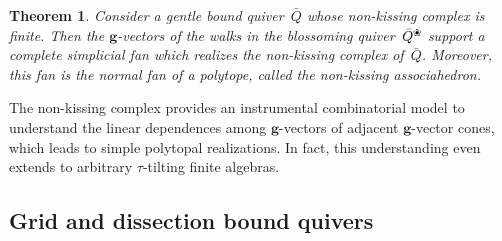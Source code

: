 \documentclass{amsart}
\newtheorem*{theorem*}{Theorem}%
\theoremstyle{definition}
\renewcommand{\b}[1]{\mathbf{#1}} %
\newcommand{\blossom}{^\text{\ding{96}}} %
\begin{document}
\begin{theorem*}
Consider a gentle bound quiver~$\bar Q$ whose non-kissing complex is finite.
Then the \mbox{$\b{g}$-vectors} of the walks in the blossoming quiver~$\bar Q\blossom$ support a complete simplicial fan which realizes the non-kissing complex of~$\bar Q$.
Moreover, this fan is the normal fan of a polytope, called the non-kissing associahedron.
\end{theorem*}

\noindent
The non-kissing complex provides an instrumental combinatorial model to understand the linear dependences among $\b{g}$-vectors of adjacent $\b{g}$-vector cones, which leads to simple polytopal realizations.
In fact, this understanding even extends to arbitrary $\tau$-tilting finite algebras.


\subsection*{Grid and dissection bound quivers}
\end{document}
